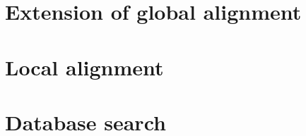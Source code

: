 \documentclass[12pt]{article}
\begin{document}
\section{Extension of global alignment}







\newpage

%
%
\setcounter{figure}{0}
\setcounter{table}{0}
\section{Local alignment}




\newpage

%
%
\setcounter{figure}{0}
\setcounter{table}{0}
\section{Database search}






\end{document}
